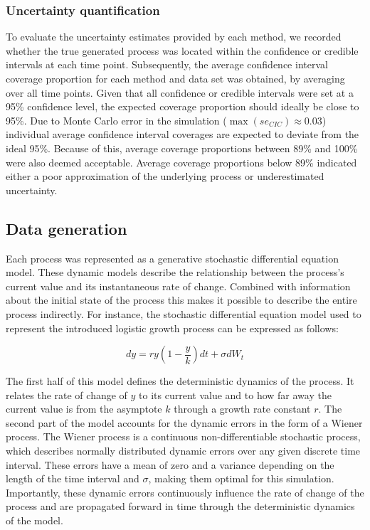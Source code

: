 \documentclass[man, floatsintext]{apa7}
\begin{document}
\subsubsection{Uncertainty quantification}

To evaluate the uncertainty estimates provided by each method, we recorded
whether the true generated process was located within the confidence or
credible intervals at each time point. Subsequently, the average confidence
interval coverage proportion for each method and data set was obtained, by
averaging over all time points. Given that all confidence or credible intervals
were set at a 95\% confidence level, the expected coverage proportion should
ideally be close to 95\%. Due to Monte Carlo error in the simulation
($\max(se_{CIC}) \approx 0.03$) individual average confidence interval
coverages are expected to deviate from the ideal 95\%. Because of this, average
coverage proportions between 89\% and 100\% were also deemed acceptable.
Average coverage proportions below 89\% indicated either a poor approximation
of the underlying process or underestimated uncertainty.

\subsection{Data generation}

Each process was represented as a generative stochastic differential equation
model. These dynamic models describe the relationship between the process's
current value and its instantaneous rate of change. Combined with information
about the initial state of the process this makes it possible to describe the
entire process indirectly. For instance, the stochastic differential equation
model used to represent the introduced logistic growth process can be expressed
as follows:

\begin{equation} \label{eq:2}
  dy = r y (1-\frac{y}{k})dt + \sigma dW_t
\end{equation}

\noindent The first half of this model defines the deterministic dynamics of
the process. It relates the rate of change of $y$ to its current value and to
how far away the current value is from the asymptote $k$ through a growth rate
constant $r$. The second part of the model accounts for the dynamic errors in
the form of a Wiener process. The Wiener process is a continuous
non-differentiable stochastic process, which describes normally distributed
dynamic errors over any given discrete time interval. These errors have a mean
of zero and a variance depending on the length of the time interval and
$\sigma$, making them optimal for this simulation. Importantly, these dynamic
errors continuously influence the rate of change of the process and are
propagated forward in time through the deterministic dynamics of the model.
\end{document}
